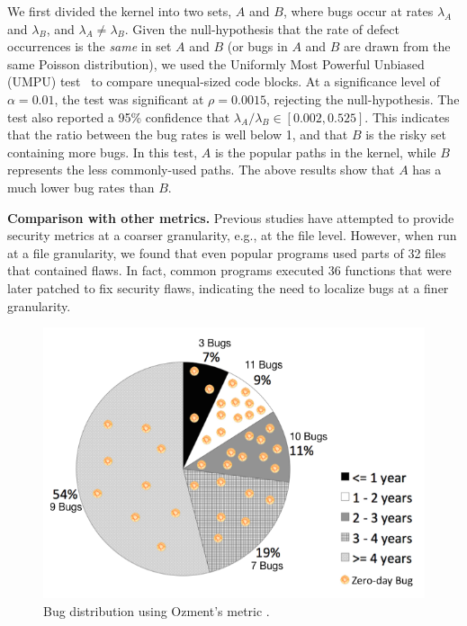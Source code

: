 We first divided the kernel into two sets,
$A$ and $B$, where bugs occur at rates $\lambda_A$ and
$\lambda_B$, and $\lambda_A \neq \lambda_B$. Given the null-hypothesis
that the rate of defect occurrences is the \textit{same} in set $A$ and $B$
(or bugs in $A$ and $B$ are drawn from the same Poisson distribution),
we used the Uniformly Most Powerful Unbiased (UMPU) test~\cite{shiue1982experiment}
to compare unequal-sized code blocks.
At a significance level of $\alpha=0.01$, the test was significant at
$\rho=0.0015$, rejecting the null-hypothesis.
The test also reported a 95\% confidence that $\lambda_A / \lambda_B
\in [0.002, 0.525]$. This indicates that the ratio between the bug rates is well
below 1, and that $B$ is the risky set containing more bugs.
In this test, $A$ is the popular paths in the kernel, while $B$
represents the less commonly-used paths. The above results show that
$A$ has a much lower bug rates than $B$.

\textbf{Comparison with other metrics.}
Previous studies have attempted to provide security metrics at a coarser granularity,
e.g., at the file level. However, when run at a file
granularity, we found that even popular programs used parts of
32 files that contained flaws.  In fact, common
programs executed 36 functions that were later patched to fix security
flaws, indicating the need to localize bugs at a finer granularity.

\begin{figure}
\centering
\includegraphics[width=1.0\columnwidth]{diagram/metrics_age.png}
\caption{\small Bug distribution using Ozment's metric \cite{ozment2006milk}.}
\label{fig:metrics_age}
\end{figure}

